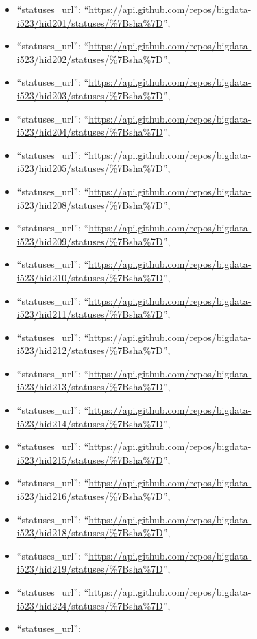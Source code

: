 \begin{itemize}
\item
  ``statuses\_url'':
  ``\url{https://api.github.com/repos/bigdata-i523/hid201/statuses/\%7Bsha\%7D}'',
\item
  ``statuses\_url'':
  ``\url{https://api.github.com/repos/bigdata-i523/hid202/statuses/\%7Bsha\%7D}'',
\item
  ``statuses\_url'':
  ``\url{https://api.github.com/repos/bigdata-i523/hid203/statuses/\%7Bsha\%7D}'',
\item
  ``statuses\_url'':
  ``\url{https://api.github.com/repos/bigdata-i523/hid204/statuses/\%7Bsha\%7D}'',
\item
  ``statuses\_url'':
  ``\url{https://api.github.com/repos/bigdata-i523/hid205/statuses/\%7Bsha\%7D}'',
\item
  ``statuses\_url'':
  ``\url{https://api.github.com/repos/bigdata-i523/hid208/statuses/\%7Bsha\%7D}'',
\item
  ``statuses\_url'':
  ``\url{https://api.github.com/repos/bigdata-i523/hid209/statuses/\%7Bsha\%7D}'',
\item
  ``statuses\_url'':
  ``\url{https://api.github.com/repos/bigdata-i523/hid210/statuses/\%7Bsha\%7D}'',
\item
  ``statuses\_url'':
  ``\url{https://api.github.com/repos/bigdata-i523/hid211/statuses/\%7Bsha\%7D}'',
\item
  ``statuses\_url'':
  ``\url{https://api.github.com/repos/bigdata-i523/hid212/statuses/\%7Bsha\%7D}'',
\item
  ``statuses\_url'':
  ``\url{https://api.github.com/repos/bigdata-i523/hid213/statuses/\%7Bsha\%7D}'',
\item
  ``statuses\_url'':
  ``\url{https://api.github.com/repos/bigdata-i523/hid214/statuses/\%7Bsha\%7D}'',
\item
  ``statuses\_url'':
  ``\url{https://api.github.com/repos/bigdata-i523/hid215/statuses/\%7Bsha\%7D}'',
\item
  ``statuses\_url'':
  ``\url{https://api.github.com/repos/bigdata-i523/hid216/statuses/\%7Bsha\%7D}'',
\item
  ``statuses\_url'':
  ``\url{https://api.github.com/repos/bigdata-i523/hid218/statuses/\%7Bsha\%7D}'',
\item
  ``statuses\_url'':
  ``\url{https://api.github.com/repos/bigdata-i523/hid219/statuses/\%7Bsha\%7D}'',
\item
  ``statuses\_url'':
  ``\url{https://api.github.com/repos/bigdata-i523/hid224/statuses/\%7Bsha\%7D}'',
\item
  ``statuses\_url'':

\end{itemize}

